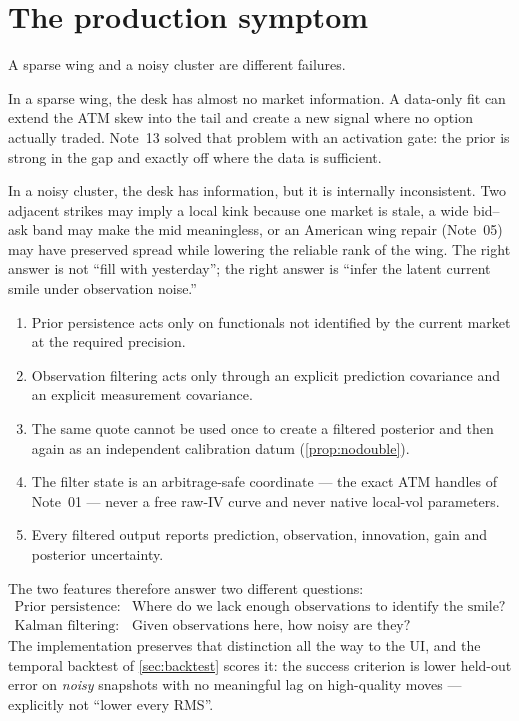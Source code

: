 \documentclass[11pt]{article}
\begin{document}
\tableofcontents
\newpage

\section{The production symptom}
\label{sec:symptom}

A sparse wing and a noisy cluster are different failures.

In a sparse wing, the desk has almost no market information. A data-only fit
can extend the ATM skew into the tail and create a new signal where no option
actually traded. Note~13 solved that problem with an activation gate: the
prior is strong in the gap and exactly off where the data is sufficient.

In a noisy cluster, the desk has information, but it is internally
inconsistent. Two adjacent strikes may imply a local kink because one market
is stale, a wide bid--ask band may make the mid meaningless, or an American
wing repair (Note~05) may have preserved spread while lowering the reliable
rank of the wing. The right answer is not ``fill with yesterday''; the right
answer is ``infer the latent current smile under observation noise.''

\begin{invariant}
\begin{enumerate}[leftmargin=1.6em]
\item Prior persistence acts only on functionals not identified by the current
market at the required precision.
\item Observation filtering acts only through an explicit prediction
covariance and an explicit measurement covariance.
\item The same quote cannot be used once to create a filtered posterior and
then again as an independent calibration datum (\cref{prop:nodouble}).
\item The filter state is an arbitrage-safe coordinate --- the exact ATM
handles of Note~01 --- never a free raw-IV curve and never native local-vol
parameters.
\item Every filtered output reports prediction, observation, innovation, gain
and posterior uncertainty.
\end{enumerate}
\end{invariant}

The two features therefore answer two different questions:
\[
\begin{array}{ll}
\text{Prior persistence:} & \text{Where do we lack enough observations to
identify the smile?}\\[2pt]
\text{Kalman filtering:} & \text{Given observations here, how noisy are they?}
\end{array}
\]
The implementation preserves that distinction all the way to the UI, and the
temporal backtest of \cref{sec:backtest} scores it: the success criterion is
lower held-out error on \emph{noisy} snapshots with no meaningful lag on
high-quality moves --- explicitly not ``lower every RMS''.
\end{document}
